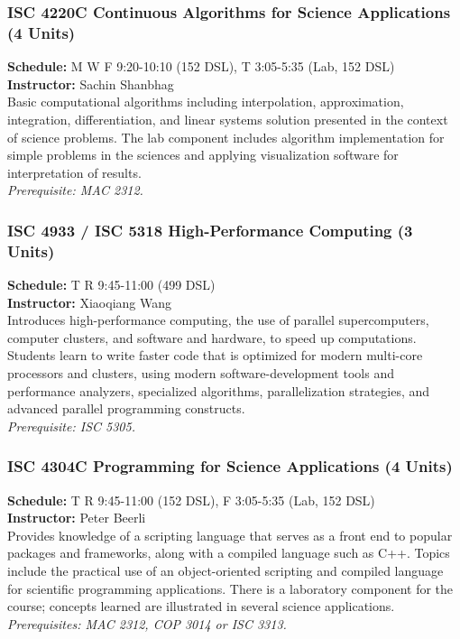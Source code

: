 \documentclass[12pt,a4paper]{article}
\begin{document}
\subsubsection*{ISC 4220C Continuous Algorithms for Science Applications (4 Units)}
\textbf{Schedule:} M W F 9:20-10:10 (152 DSL), T 3:05-5:35 (Lab, 152 DSL) \\
\textbf{Instructor:} Sachin Shanbhag \\
Basic computational algorithms including interpolation, approximation, integration, differentiation, and linear systems solution presented in the context of science problems. The lab component includes algorithm implementation for simple problems in the sciences and applying visualization software for interpretation of results. \\
\textit{Prerequisite: MAC 2312.}

\subsubsection*{ISC 4933 / ISC 5318 High-Performance Computing (3 Units)}
\textbf{Schedule:} T R 9:45-11:00 (499 DSL) \\
\textbf{Instructor:} Xiaoqiang Wang \\
Introduces high-performance computing, the use of parallel supercomputers, computer clusters, and software and hardware, to speed up computations. Students learn to write faster code that is optimized for modern multi-core processors and clusters, using modern software-development tools and performance analyzers, specialized algorithms, parallelization strategies, and advanced parallel programming constructs. \\
\textit{Prerequisite: ISC 5305.}

\subsubsection*{ISC 4304C Programming for Science Applications (4 Units)}
\textbf{Schedule:} T R 9:45-11:00 (152 DSL), F 3:05-5:35 (Lab, 152 DSL) \\
\textbf{Instructor:} Peter Beerli \\
Provides knowledge of a scripting language that serves as a front end to popular packages and frameworks, along with a compiled language such as C++. Topics include the practical use of an object-oriented scripting and compiled language for scientific programming applications. There is a laboratory component for the course; concepts learned are illustrated in several science applications. \\
\textit{Prerequisites: MAC 2312, COP 3014 or ISC 3313.}
\end{document}
